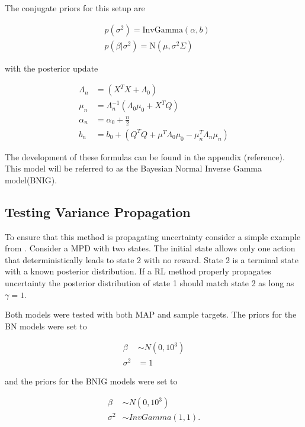 The conjugate priors for this setup are

\begin{align*}
    & p(\sigma^2) = \text{InvGamma}(\alpha, b)          \\
    & p(\beta|\sigma^2) = \text{N}(\mu, \sigma^2\Sigma) 
\end{align*}

with the posterior update

\begin{align*}
    \label{eq:unknown_noise_posterior_update}
	\Lambda_n & = (X^TX + \Lambda_0)                                         \\
	\mu_n     & = \Lambda_n^{-1}(\Lambda_0\mu_0 + X^TQ)                      \\
	\alpha_n  & = \alpha_0 + \frac{n}{2}                                     \\
	b_n       & = b_0 + (Q^TQ + \mu^T\Lambda_0\mu_0 - \mu_n^T\Lambda_n\mu_n) 
\end{align*}

The development of these formulas can be found in the appendix (\todo reference). This model will be referred to as the Bayesian Normal Inverse Gamma model(BNIG).

\subsection{Testing Variance Propagation}

To ensure that this method is propagating uncertainty consider a simple example from \cite{osband_2018}. Consider a MPD with two states. The initial state allows only one action that deterministically leads to state 2 with no reward. State 2 is a terminal state with a known posterior distribution. If a RL method properly propagates uncertainty the posterior distribution of state 1 should match state 2 as long as $\gamma=1$. 

Both models were tested with both MAP and sample targets. The priors for the BN models were set to

\begin{align*}
    \beta &\sim N(0,10^3)\\
    \sigma^2 &= 1
\end{align*}

and the priors for the BNIG models were set to

\begin{align*}
    \beta &\sim N(0,10^3) \\
    \sigma^2 &\sim InvGamma(1,1).
\end{align*}

